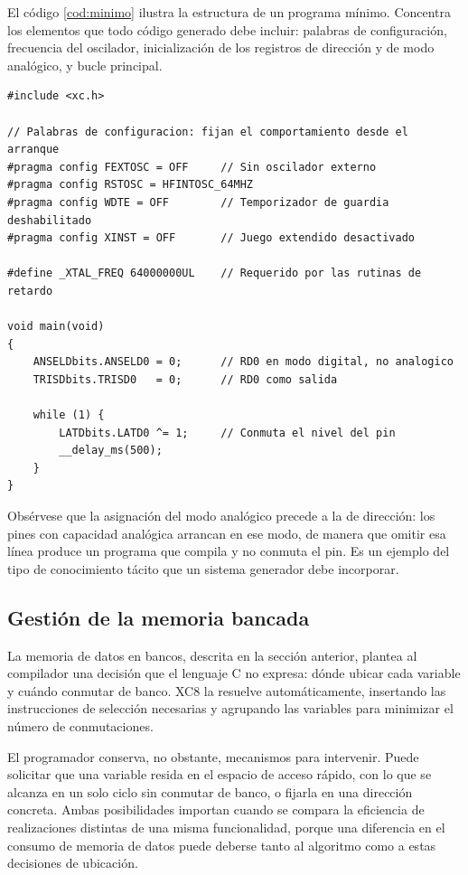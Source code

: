 El código \ref{cod:minimo} ilustra la estructura de un programa mínimo. Concentra
los elementos que todo código generado debe incluir: palabras de configuración,
frecuencia del oscilador, inicialización de los registros de dirección y de modo
analógico, y bucle principal.

\begin{lstlisting}[caption={Estructura mínima de un programa para el PIC18F47Q10},
                   label={cod:minimo}]
#include <xc.h>

// Palabras de configuracion: fijan el comportamiento desde el arranque
#pragma config FEXTOSC = OFF     // Sin oscilador externo
#pragma config RSTOSC = HFINTOSC_64MHZ
#pragma config WDTE = OFF        // Temporizador de guardia deshabilitado
#pragma config XINST = OFF       // Juego extendido desactivado

#define _XTAL_FREQ 64000000UL    // Requerido por las rutinas de retardo

void main(void)
{
    ANSELDbits.ANSELD0 = 0;      // RD0 en modo digital, no analogico
    TRISDbits.TRISD0   = 0;      // RD0 como salida

    while (1) {
        LATDbits.LATD0 ^= 1;     // Conmuta el nivel del pin
        __delay_ms(500);
    }
}
\end{lstlisting}

Obsérvese que la asignación del modo analógico precede a la de dirección: los
pines con capacidad analógica arrancan en ese modo, de manera que omitir esa
línea produce un programa que compila y no conmuta el pin. Es un ejemplo del tipo
de conocimiento tácito que un sistema generador debe incorporar.

\subsection{Gestión de la memoria bancada}

La memoria de datos en bancos, descrita en la sección anterior, plantea al
compilador una decisión que el lenguaje C no expresa: dónde ubicar cada variable
y cuándo conmutar de banco. XC8 la resuelve automáticamente, insertando las
instrucciones de selección necesarias y agrupando las variables para minimizar
el número de conmutaciones.

El programador conserva, no obstante, mecanismos para intervenir. Puede solicitar
que una variable resida en el espacio de acceso rápido, con lo que se alcanza en
un solo ciclo sin conmutar de banco, o fijarla en una dirección concreta. Ambas
posibilidades importan cuando se compara la eficiencia de realizaciones
distintas de una misma funcionalidad, porque una diferencia en el consumo de
memoria de datos puede deberse tanto al algoritmo como a estas decisiones de
ubicación.

